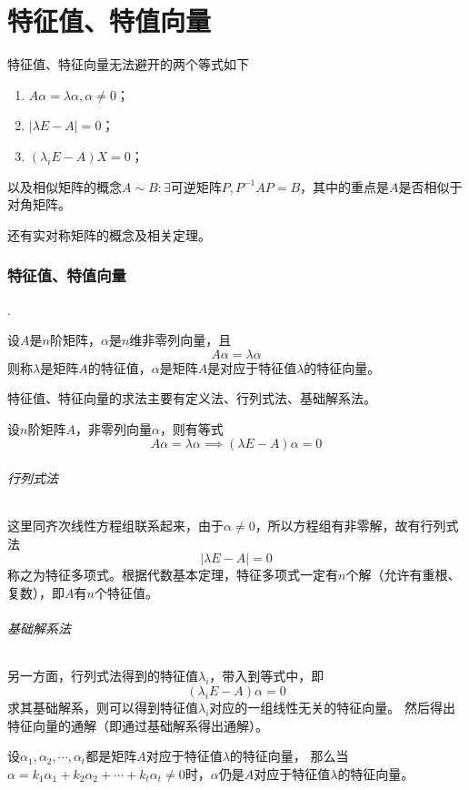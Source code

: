 \part{特征值、特值向量}
特征值、特征向量无法避开的两个等式如下
\begin{enumerate}[(1)]
    \item $A\alpha = \lambda\alpha, \alpha \neq 0$；
    \item $|\lambda E - A| = 0$；
    \item $(\lambda_i E - A )X = 0$；
\end{enumerate}

以及相似矩阵的概念$A\sim B : \exists \text{可逆矩阵}P, P^{-1}AP = B$，其中的重点是$A$是否相似于对角矩阵。

还有实对称矩阵的概念及相关定理。

\section{特征值、特值向量}
.
\begin{definition}
    设$A$是$n$阶矩阵，$\alpha$是$n$维非零列向量，且
    \[ A\alpha = \lambda\alpha \]
    则称$\lambda$是矩阵$A$的特征值，$\alpha$是矩阵$A$是对应于特征值$\lambda$的特征向量。
\end{definition}
特征值、特征向量的求法主要有定义法、行列式法、基础解系法。


设$n$阶矩阵$A$，非零列向量$\alpha$，则有等式
\[ A\alpha = \lambda\alpha \implies (\lambda E -A)\alpha = 0 \]

\paragraph{行列式法}
这里同齐次线性方程组联系起来，由于$\alpha\neq 0$，所以方程组有非零解，故有行列式法
\begin{equation}
    |\lambda E- A| = 0
\end{equation}
称之为特征多项式。根据代数基本定理，特征多项式一定有$n$个解（允许有重根、复数），即$A$有$n$个特征值。

\paragraph{基础解系法}
另一方面，行列式法得到的特征值$\lambda_i$，带入到等式中，即
\[  (\lambda_i E -A)\alpha = 0 \]
求其基础解系，则可以得到特征值$\lambda_i$对应的一组线性无关的特征向量。
然后得出特征向量的通解（即通过基础解系得出通解）。

\begin{theorem}
    设$\alpha_1,\alpha_2,\cdots,\alpha_t$都是矩阵$A$对应于特征值$\lambda$的特征向量，
    那么当$\alpha = k_1\alpha_1+k_2\alpha_2 + \cdots + k_t\alpha_t \neq 0$时，$\alpha$仍是$A$对应于特征值$\lambda$的特征向量。
\end{theorem}

